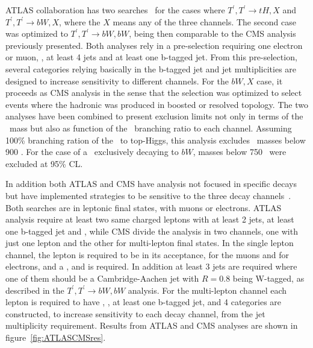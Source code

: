 ATLAS collaboration has two searches~\cite{ATLAS-CONF-2015-012} for the cases where $T^{'},T^{'}\rightarrow tH,X$ and $T^{'},T^{'}\rightarrow bW,X$, where the $X$ means any of the three channels. The second case was optimized to $T^{'},T^{'}\rightarrow bW,bW$, being then comparable to the CMS analysis previously presented. Both analyses rely in a pre-selection requiring one electron or muon, , at least 4 jets and at least one b-tagged jet. From this pre-selection, several categories relying basically in the b-tagged jet and jet multiplicities are designed to increase sensitivity to different channels. For the $bW,X$ case, it proceeds as CMS analysis in the sense that the selection was optimized to select events where the hadronic \W was produced in boosted or resolved topology. The two analyses have been combined to present exclusion limits not only in terms of the \Tp~mass but also as function of the \Tp~branching ratio to each channel. Assuming 100\% branching ration of the \Tp~to top-Higgs, this analysis excludes \Tp~masses below 900 \GeVcc. For the case of a \Tp~exclusively decaying to $bW$, masses below 750 \GeVcc~were excluded at 95\% CL.

In addition both ATLAS and CMS have analysis not focused in specific decays but have implemented strategies to be sensitive to the three decay channels~\cite{Aad:2015gdg,Chatrchyan:2013uxa}. Both searches are in leptonic final states, with muons or electrons. ATLAS analysis require at least two same charged leptons with at least 2 jets, at least one b-tagged jet and , while CMS divide the analysis in two channels, one with just one lepton and the other for multi-lepton final states. In the single lepton channel, the lepton is required to be in its acceptance,  for the muons and  for electrons, and a , and  is required. In addition at least 3 jets are required where one of them should be a Cambridge-Aachen jet with $R=0.8$ being W-tagged, as described in the $T^{'},T^{'}\rightarrow bW,bW$ analysis. For the multi-lepton channel each lepton is required to have , , at least one b-tagged jet, and 4 categories are constructed, to increase sensitivity to each decay channel, from the jet multiplicity requirement. Results from ATLAS and CMS analyses are shown in figure~\ref{fig:ATLASCMSres}.   

